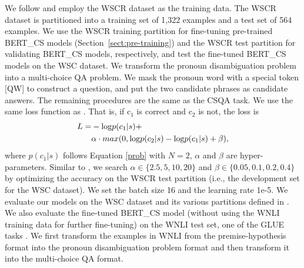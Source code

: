 \documentclass[11pt,a4paper]{article}
\begin{document}
We follow \citet{kocijan2019surprisingly} and employ the WSCR dataset \citep{rahman-ng-2012-resolving} as the training data. The WSCR dataset is partitioned into a training set of 1,322 examples and a test set of 564 examples. We use the WSCR training partition for fine-tuning pre-trained BERT\_CS models (Section~\ref{sect:pre-training}) and the WSCR test partition for validating BERT\_CS models, respectively, and test the fine-tuned BERT\_CS models on the WSC dataset.  We transform the pronoun disambiguation problem into a multi-choice QA problem. We mask the pronoun word with a special token [QW] to construct a question, and put the two candidate phrases as candidate answers.
The remaining procedures are the same as the CSQA task.
We use the same loss function as \citet{kocijan2019surprisingly}. 
That is, if c$_1$ is correct and c$_2$ is not, the loss is
\begin{equation}
\begin{aligned}
L = &- {\rm log}p(c_1|s) + \\
    &\alpha \cdot max(0, {\rm log}p(c_2|s)-{\rm log}p(c_1|s)+\beta), \end{aligned}
\end{equation}
where $p(c_1|s)$ follows Equation \ref{prob} with $N=2$, $\alpha$ and $\beta$ are hyper-parameters.
Similar to \citet{kocijan2019surprisingly}, we search $\alpha \in \{2.5,5,10,20\}$ and $\beta \in \{0.05,0.1,0.2,0.4\}$ by optimizing the accuracy on the WSCR test partition (i.e., the development set for the WSC dataset).
We set the batch size 16 and the learning rate 1e-5.
We evaluate our models on the WSC dataset and its various partitions defined in \citet{trichelair-etal-2019-reasonable}. 
We also evaluate the fine-tuned BERT\_CS model (without using the WNLI training data for further fine-tuning) on the WNLI test set, one of the GLUE tasks \citep{wang-etal-2018-glue}.
We first transform the examples in WNLI from the premise-hypothesis format into the pronoun disambiguation problem format \citep{kocijan2019surprisingly} and then transform it into the multi-choice QA format.
\end{document}
